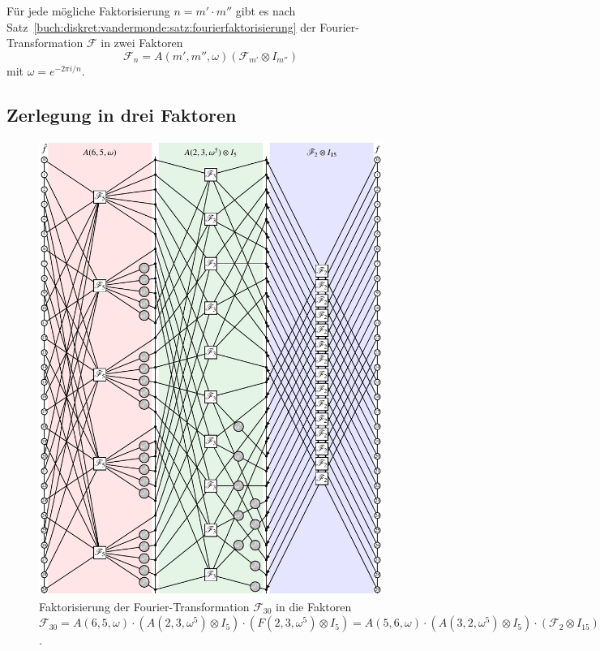 Für jede mögliche Faktorisierung $n=m'\cdot m''$ gibt es nach
Satz~\ref{buch:diskret:vandermonde:satz:fourierfaktorisierung}
der Fourier-Transformation $\mathscr{F}$ in zwei Faktoren
\[
\mathscr{F}_n
=
A(m',m'',\omega) (\mathscr{F}_{m'} \otimes I_{m''})
\]
mit $\omega=e^{-2\pi i/n}$.

%
%
\subsection{Zerlegung in drei Faktoren
\label{buch:diskret:schnell:subsection:dreifaktoren}}
\begin{figure}
\centering
\includegraphics{chapters/060-diskret/images/f30.pdf}
\caption{Faktorisierung der Fourier-Transformation
$\mathscr{F}_{30}$ in die Faktoren
$\mathscr{F}_{30}
=
A(6,5,\omega)
\cdot
(A(2,3,\omega^5)\otimes I_5)
\cdot
(F(2,3,\omega^5)\otimes I_5)
=
A(5,6,\omega)
\cdot
(A(3,2,\omega^5)\otimes I_5)
\cdot
(\mathscr{F}_2\otimes I_{15})
$.
\label{buch:diskret:faktorisierung:fig:f30}}
\end{figure}
